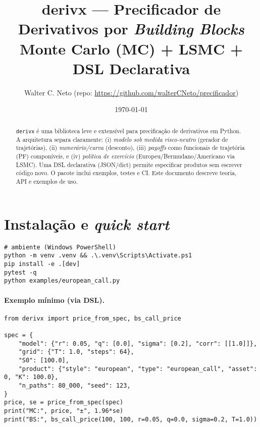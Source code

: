 \documentclass[11pt,a4paper]{article}
\title{\textbf{derivx} --- Precificador de Derivativos por \emph{Building Blocks}\\
\large Monte Carlo (MC) + LSMC + DSL Declarativa}
\author{Walter C. Neto (repo: \url{https://github.com/walterCNeto/precificador})}
\date{\today}
\begin{document}
\maketitle

\begin{abstract}
\texttt{derivx} é uma biblioteca leve e extensível para precificação de derivativos em Python.
A arquitetura separa claramente: (i) \emph{modelo sob medida risco-neutro} (gerador de trajetórias),
(ii) \emph{numerário/curva} (desconto), (iii) \emph{payoffs} como funcionais de trajetória (PF) componíveis,
e (iv) \emph{política de exercício} (Europeu/Bermudano/Americano via LSMC).
Uma DSL declarativa (JSON/dict) permite especificar produtos sem escrever código novo.
O pacote inclui exemplos, testes e CI. Este documento descreve teoria, API e exemplos de uso.
\end{abstract}

\section{Instalação e \emph{quick start}}
\begin{verbatim}
# ambiente (Windows PowerShell)
python -m venv .venv && .\.venv\Scripts\Activate.ps1
pip install -e .[dev]
pytest -q
python examples/european_call.py
\end{verbatim}

\paragraph{Exemplo mínimo (via DSL).}
\begin{lstlisting}[style=pystyle]
from derivx import price_from_spec, bs_call_price

spec = {
    "model": {"r": 0.05, "q": [0.0], "sigma": [0.2], "corr": [[1.0]]},
    "grid": {"T": 1.0, "steps": 64},
    "S0": [100.0],
    "product": {"style": "european", "type": "european_call", "asset": 0, "K": 100.0},
    "n_paths": 80_000, "seed": 123,
}
price, se = price_from_spec(spec)
print("MC:", price, "±", 1.96*se)
print("BS:", bs_call_price(100, 100, r=0.05, q=0.0, sigma=0.2, T=1.0))
\end{lstlisting}
\end{document}
